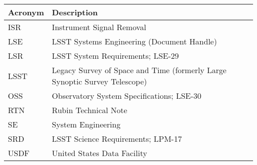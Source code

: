 \addtocounter{table}{-1}
\begin{longtable}{p{}p{}}\hline
\textbf{Acronym} & \textbf{Description}  \\\hline

ISR & Instrument Signal Removal \\\hline
LSE & LSST Systems Engineering (Document Handle) \\\hline
LSR & LSST System Requirements; LSE-29 \\\hline
LSST & Legacy Survey of Space and Time (formerly Large Synoptic Survey Telescope) \\\hline
OSS & Observatory System Specifications; LSE-30 \\\hline
RTN & Rubin Technical Note \\\hline
SE & System Engineering \\\hline
SRD & LSST Science Requirements; LPM-17 \\\hline
USDF & United States Data Facility \\\hline
\end{longtable}
